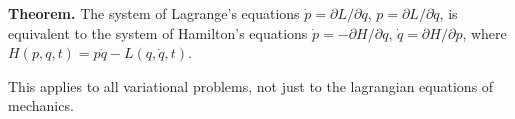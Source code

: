 \textbf{Theorem.} The system of Lagrange's equations $\dot{p} = \partial L/\partial q$, $p = \partial L/\partial \dot{q}$, is equivalent to the system of Hamilton's equations $\dot{p} = -\partial H/\partial q$, $\dot{q} = \partial H/\partial p$, where $H(p, q, t) = p\dot{q} - L(q, \dot{q}, t)$.

This applies to all variational problems, not just to the lagrangian equations of mechanics.
